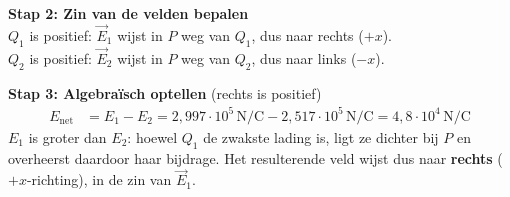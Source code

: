 \documentclass{ximera}
\begin{document}
\begin{exercise}
\begin{solution}
        \textbf{Stap 2: Zin van de velden bepalen}\\
        $Q_1$ is positief: $\vec{E}_1$ wijst in $P$ weg van $Q_1$, dus naar rechts ($+x$).\\
        $Q_2$ is positief: $\vec{E}_2$ wijst in $P$ weg van $Q_2$, dus naar links ($-x$).

        \textbf{Stap 3: Algebraïsch optellen} (rechts is positief)
        \begin{align*}
            E_{\text{net}} &= E_1 - E_2 = 2{,}997 \cdot 10^{5} \, \mathrm{N/C} - 2{,}517 \cdot 10^{5} \, \mathrm{N/C} = \boxed{4{,}8 \cdot 10^{4} \, \mathrm{N/C}}
        \end{align*}
        $E_1$ is groter dan $E_2$: hoewel $Q_1$ de zwakste lading is, ligt ze dichter bij $P$ en overheerst daardoor haar bijdrage. Het resulterende veld wijst dus naar \textbf{rechts} ($+x$-richting), in de zin van $\vec{E}_1$.
    \end{solution}
\end{exercise}
\end{document}
